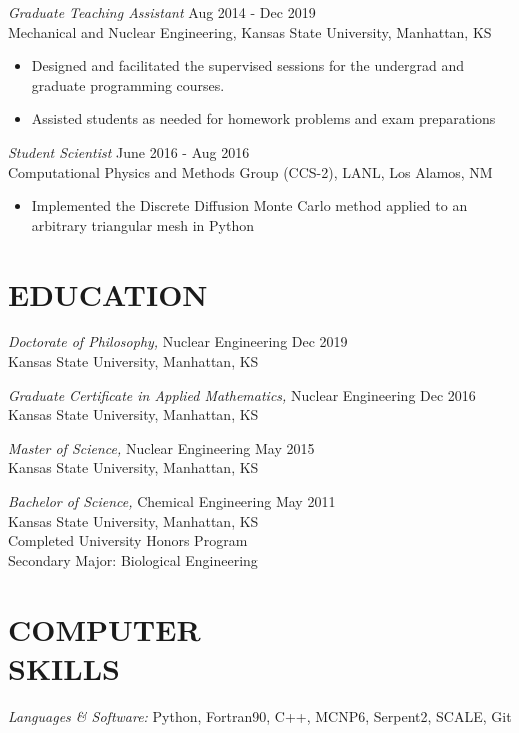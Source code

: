 \documentclass[margin, 10pt]{res} %
\begin{document}
\begin{resume}
{\sl Graduate Teaching Assistant} \hfill Aug 2014 - Dec 2019 \\
Mechanical and Nuclear Engineering, Kansas State University, Manhattan, KS
\begin{itemize}
\item Designed and facilitated the supervised sessions for the undergrad and graduate programming courses.
\item Assisted students as needed for homework problems and exam preparations
\end{itemize}

{\sl Student Scientist} \hfill June 2016 - Aug 2016 \\
Computational Physics and Methods Group (CCS-2), LANL, Los Alamos, NM
\begin{itemize}
\item Implemented the Discrete Diffusion Monte Carlo method applied to an arbitrary triangular mesh in Python
\end{itemize}

\section{EDUCATION}

{\sl Doctorate of Philosophy,} Nuclear Engineering \hfill Dec 2019\\
Kansas State University, Manhattan, KS

{\sl Graduate Certificate in Applied Mathematics,} Nuclear Engineering \hfill Dec 2016\\
Kansas State University, Manhattan, KS

{\sl Master of Science,} Nuclear Engineering \hfill May 2015\\
Kansas State University, Manhattan, KS

{\sl Bachelor of Science,} Chemical Engineering \hfill May 2011 \\
Kansas State University, Manhattan, KS \\
Completed University Honors Program \\
Secondary Major: Biological Engineering

\section{COMPUTER \\ SKILLS}

{\sl Languages \& Software:}
Python, Fortran90, C++, MCNP6, Serpent2, SCALE, Git  \\


\end{resume}
\end{document}

